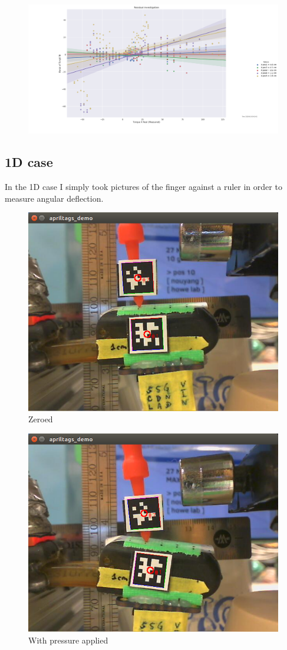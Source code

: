 \documentclass[preprint,12pt,3p]{elsarticle}
\begin{document}
\begin{figure}[H]
\centering
\includegraphics[width=.9\textwidth]{images/round1/ResidX_hueX.png}
\end{figure}


\subsection{1D case}

In the 1D case I simply took pictures of the finger against a ruler in order to measure angular deflection. 

\begin{figure}[H]
\centering
\includegraphics[width=.3\textwidth]{images/1d/zero.png}
\caption{Zeroed}
\end{figure}

\begin{figure}[H]
\centering
\includegraphics[width=.3\textwidth]{images/1d/weighted.png}
\caption{With pressure applied}
\end{figure}
\end{document}
